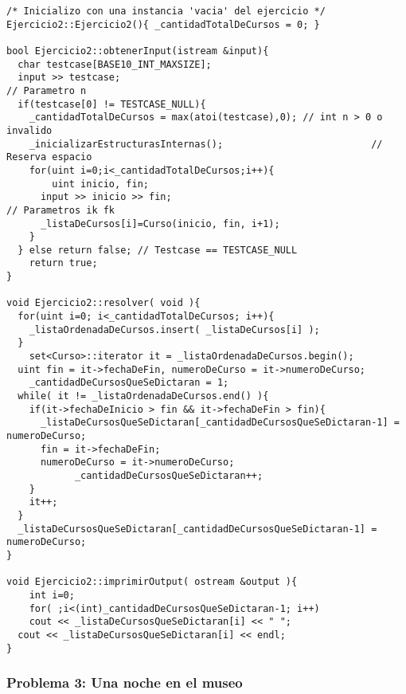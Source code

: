 \documentclass[11pt, a4paper, twoside]{article}
\begin{document}
\begin{lstlisting}
/* Inicializo con una instancia 'vacia' del ejercicio */
Ejercicio2::Ejercicio2(){ _cantidadTotalDeCursos = 0; }

bool Ejercicio2::obtenerInput(istream &input){
  char testcase[BASE10_INT_MAXSIZE];
  input >> testcase; 																// Parametro n
  if(testcase[0] != TESTCASE_NULL){
    _cantidadTotalDeCursos = max(atoi(testcase),0); // int n > 0 o invalido
    _inicializarEstructurasInternas(); 							// Reserva espacio
    for(uint i=0;i<_cantidadTotalDeCursos;i++){
    	uint inicio, fin;
      input >> inicio >> fin;												// Parametros ik fk
      _listaDeCursos[i]=Curso(inicio, fin, i+1);
    }
  } else return false; // Testcase == TESTCASE_NULL
	return true;
}

void Ejercicio2::resolver( void ){
  for(uint i=0; i<_cantidadTotalDeCursos; i++){
  	_listaOrdenadaDeCursos.insert( _listaDeCursos[i] );
  }
	set<Curso>::iterator it = _listaOrdenadaDeCursos.begin();
  uint fin = it->fechaDeFin, numeroDeCurso = it->numeroDeCurso;
	_cantidadDeCursosQueSeDictaran = 1;
  while( it != _listaOrdenadaDeCursos.end() ){
    if(it->fechaDeInicio > fin && it->fechaDeFin > fin){
      _listaDeCursosQueSeDictaran[_cantidadDeCursosQueSeDictaran-1] = numeroDeCurso;
      fin = it->fechaDeFin;
      numeroDeCurso = it->numeroDeCurso;
			_cantidadDeCursosQueSeDictaran++;
    }
    it++;
  }
  _listaDeCursosQueSeDictaran[_cantidadDeCursosQueSeDictaran-1] = numeroDeCurso;
}

void Ejercicio2::imprimirOutput( ostream &output ){
	int i=0;
	for( ;i<(int)_cantidadDeCursosQueSeDictaran-1; i++)
    cout << _listaDeCursosQueSeDictaran[i] << " ";
  cout << _listaDeCursosQueSeDictaran[i] << endl;
}
\end{lstlisting}
\clearpage

\subsubsection{Problema 3: Una noche en el museo}
\end{document}
